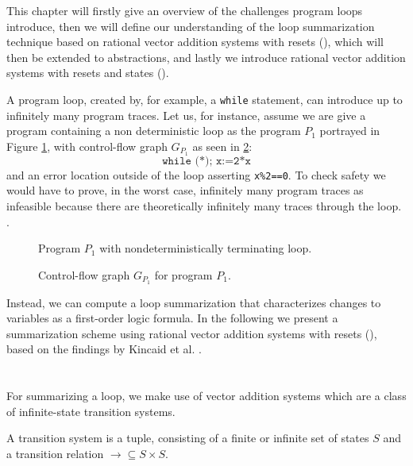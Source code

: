 This chapter will firstly give an overview of the challenges program loops introduce, then we will define our understanding of the loop summarization technique based on rational vector addition systems with resets (\qvasr), which will then be extended to \qvasr abstractions, and lastly we introduce rational vector addition systems with resets and states (\qvasrs). \par
A program loop, created by, for example, a \texttt{while} statement, can introduce up to infinitely many program traces. Let us, for instance, assume we are give a program containing a non deterministic loop as the program $P_1$ portrayed in Figure \ref{codeExMotAss}, with control-flow graph $G_{P_1}$ as seen in \ref{cfgExMotAss}: \begin{equation*}
	\texttt{while (*); x:=2*x}
\end{equation*}
and an error location outside of the loop asserting \texttt{x\%2==0}. To check safety we would have to prove, in the worst case, infinitely many program traces as infeasible because there are theoretically infinitely many traces through the loop.
.\begin{center}
	\begin{minipage}[b]{0.4\linewidth}
		\begin{figure}[H]
			\centering
			
			\caption{Program $P_1$ with nondeterministically terminating loop.}
			\label{codeExMotAss}
		\end{figure}
	\end{minipage}
	\hfill
	\begin{minipage}[b]{0.59\linewidth}
		\begin{figure}[H]
			\centering
			
			\caption{Control-flow graph $G_{P_1}$ for program $P_1$.}
			\label{cfgExMotAss}
		\end{figure}
	\end{minipage}
\end{center}
Instead, we can compute a loop summarization that characterizes changes to variables as a first-order logic formula. In the following we present a summarization scheme using rational vector addition systems with resets (\qvasr), based on the findings by Kincaid et al. \cite{DBLP:conf/cav/SilvermanK19}.
\section{\qvasr}
For summarizing a loop, we make use of vector addition systems which are a class of infinite-state transition systems.
\begin{mydef}
	A transition system \transSys{} is a tuple, consisting of a finite or infinite set of states $S$ and a transition relation $\rightarrow \subseteq S \times S$.
\end{mydef}

